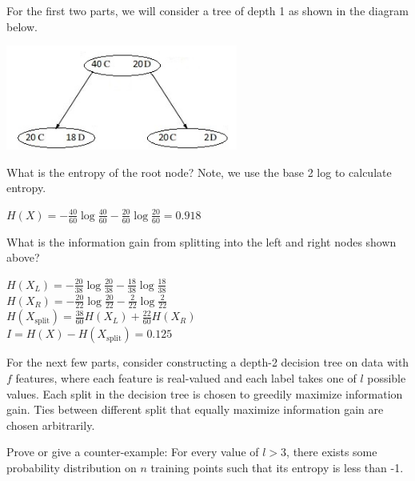 
For the first two parts, we will consider a tree of depth 1 as shown in the diagram below. 

\begin{center}
\includegraphics[width=3in]{src/problems/decision_tree/DecisionTree.jpg}
\end{center}

\begin{Parts}

\Part What is the entropy of the root node? Note, we use the base 2 log to calculate entropy.


\begin{solution}

$ H(X) = -\frac{40}{60}\log\frac{40}{60} - \frac{20}{60}\log\frac{20}{60} = 0.918 $

\end{solution}

\Part What is the information gain from splitting into the left and right nodes shown above?

\begin{solution}

$ H(X_L) = -\frac{20}{38}\log\frac{20}{38} - \frac{18}{38}\log\frac{18}{38} $ \\
$ H(X_R) = -\frac{20}{22}\log\frac{20}{22} - \frac{2}{22}\log\frac{2}{22} $ \\
$ H(X_\text{split}) = \frac{38}{60}H(X_L) + \frac{22}{60}H(X_R) $ \\
$ I = H(X) - H(X_\text{split}) = 0.125 $\\
\end{solution}

For the next few parts, consider constructing a depth-2 decision tree on data with $f$ features, where each feature is real-valued and each label takes one of $l$ possible values. Each split in the decision tree is chosen to greedily maximize information gain. Ties between different split that equally maximize information gain are chosen arbitrarily.

\Part
Prove or give a counter-example: For every value of $l > 3$, there exists some probability distribution on $n$ training points such that its entropy is less than -1.


\end{Parts}
